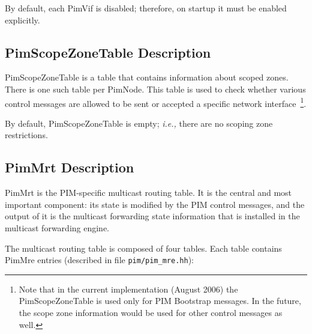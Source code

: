 \documentclass[11pt]{article}
\newcommand{\ie}{\emph{i.e.,}\xspace}
\begin{document}
By default, each PimVif is disabled; therefore, on startup it must be
enabled explicitly. 


\subsection{PimScopeZoneTable Description}

PimScopeZoneTable is a table that contains information about scoped
zones. There is one such table per PimNode. This table is used to check
whether various control messages are allowed to be sent or accepted a
specific network interface~\footnote{Note that in the current implementation
(August 2006) the PimScopeZoneTable is used only for PIM
Bootstrap messages. In the future, the scope zone information would be
used for other control messages as well.}.

By default, PimScopeZoneTable is empty; \ie there are no scoping zone
restrictions.


\subsection{PimMrt Description}

PimMrt is the PIM-specific multicast routing table. It is the central
and most important component: its state is modified by the PIM control
messages, and the output of it is the multicast forwarding state
information that is installed in the multicast forwarding engine.

The multicast routing table is composed of four tables. Each table
contains PimMre entries (described in file \verb=pim/pim_mre.hh=):
\end{document}
